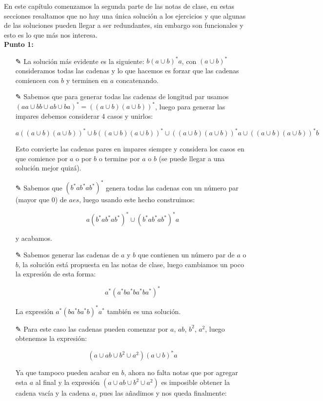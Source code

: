 En este capítulo comenzamos la segunda parte de las notas de clase, en estas secciones resaltamos que no hay una única solución a los ejercicios y que algunas de las soluciones pueden llegar a ser redundantes, sin embargo son funcionales y esto es lo que más nos interesa.\\


\textbf{Punto 1:} \begin{itemize}
    \item [✎] La solución más evidente es la siguiente: $b(a\cup b)^*a$, con $(a\cup b)^*$ consideramos todas las cadenas y lo que hacemos es forzar que las cadenas comiencen con $b$ y terminen en $a$ concatenando.

    \item[✎] Sabemos que para generar todas las cadenas de longitud par usamos $(aa\cup bb\cup ab\cup ba)^*=((a\cup b)(a\cup b))^*$, luego para generar las impares debemos considerar 4 casos y unirlos:

    $$a((a\cup b)(a\cup b))^*\cup b((a\cup b)(a\cup b))^* \cup ((a\cup b)(a\cup b))^*a \cup ((a\cup b)(a\cup b))^*b$$

    Esto convierte las cadenas pares en impares siempre y considera los casos en que comience por $a$ o por $b$ o termine por $a$ o $b$ (se puede llegar a una solución mejor quizá).

    \item[✎] Sabemos que $(b^*ab^*ab^*)^*$ genera todas las cadenas con un número par (mayor que 0) de $aes$, luego usando este hecho construimos:

    $$a(b^*ab^*ab^*)^*\cup (b^*ab^*ab^*)^*a$$

    y acabamos.

    \item[✎] Sabemos generar las cadenas de $a$ y $b$ que contienen un número par de $a$ o $b$, la solución está propuesta en las notas de clase, luego cambiamos un poco la expresión de esta forma:

    $$a^*(a^*ba^*ba^*ba^*)^*$$

    La expresión $a^*(ba^*ba^*b)^*a^*$ también es una solución.

    \item[✎] Para este caso las cadenas pueden comenzar por $a$, $ab$, $b^2$, $a^2$, luego obtenemos la expresión:

    $$(a\cup ab \cup b^2 \cup a^2)(a \cup b)^*a $$

    Ya que tampoco pueden acabar en $b$, ahora no falta notas que por agregar esta $a$ al final y la expresión $(a\cup ab \cup b^2 \cup a^2)$ es imposible obtener la cadena vacía y la cadena $a$, pues las añadimos y nos queda finalmente:


\end{itemize}
